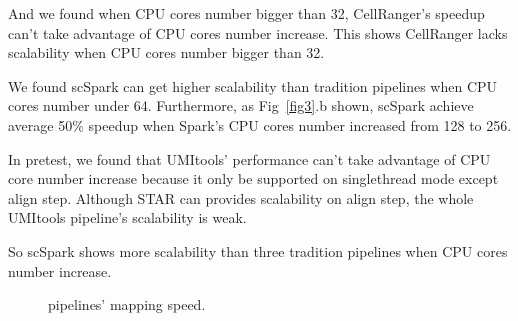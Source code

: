 \documentclass[conference]{IEEEtran}
\begin{document}
And we found when CPU cores number bigger than 32, CellRanger's speedup can't take advantage of CPU cores number increase.
This shows CellRanger lacks scalability when CPU cores number bigger than 32.

We found scSpark can get higher scalability than tradition pipelines when CPU cores number under 64.
Furthermore, as Fig~\ref{fig3}.b shown, scSpark achieve average 50\% speedup when Spark's CPU cores number increased from 128 to 256.

In pretest, we found that UMI\-tools' performance can't take advantage of CPU core number increase because it only be supported on single\-thread mode except align step.
Although STAR can provides scalability on align step, the whole UMI\-tools pipeline's scalability is weak.

So scSpark shows more scalability than three tradition pipelines when CPU cores number increase.

\begin{figure}
	\centering
	\caption{ pipelines' mapping speed. }
	\label{fig4}
\end{figure}
\end{document}
